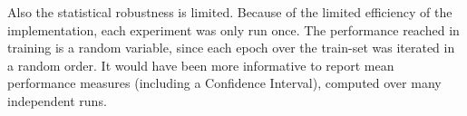 Also the statistical robustness is limited. 
Because of the limited efficiency of the implementation, 
each experiment was only run once. 
The performance reached in training is a random variable, 
since each epoch over the train-set was iterated in a random order.
It would have been more informative to report mean performance measures (including a Confidence Interval), 
computed over many independent runs.